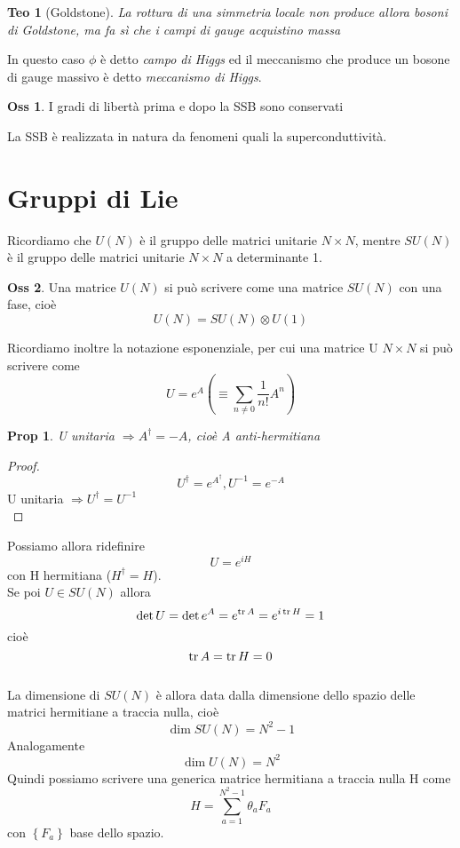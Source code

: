 \documentclass[10pt,a4paper]{article}
\newtheorem{thm}{Teo}[section]
\newtheorem{prop}{Prop}[section]
\theoremstyle{definition}
\newtheorem{observation}{Oss}[section]
\begin{document}
\begin{thm}[Goldstone]
    La rottura di una simmetria locale non produce allora bosoni di Goldstone, ma fa sì che i campi di gauge acquistino massa 
\end{thm}
In questo caso $\phi$ è detto \textit{campo di Higgs} ed il meccanismo che produce un bosone di gauge massivo è detto \textit{meccanismo di Higgs}.
\begin{observation}
    I gradi di libertà prima e dopo la SSB sono conservati
\end{observation}
La SSB è realizzata in natura da fenomeni quali la superconduttività.

\section{Gruppi di Lie}
Ricordiamo che $U(N)$ è il gruppo delle matrici unitarie $N\times N$, mentre $SU(N)$ è il gruppo delle matrici unitarie $N \times N$ a determinante 1.
\begin{observation}
    Una matrice $U(N)$ si può scrivere come una matrice $SU(N)$ con una fase, cioè
    \[
    U(N) = SU(N) \otimes U(1)    
    \]
\end{observation} 
Ricordiamo inoltre la notazione esponenziale, per cui una matrice U $N \times N$ si può scrivere come
\[
U = e^{A} \left( \equiv \sum_{n \neq 0} \frac{1}{n!} A^n \right)    
\]
\begin{prop}
    U unitaria $\Rightarrow A^\dagger = -A$, cioè A anti-hermitiana 
\end{prop}

\begin{proof}
    \[U^\dagger = e^{A^\dagger}, U^{-1} = e^{-A}\] U unitaria $\Rightarrow U^\dagger = U^{-1}$ \\
\end{proof}

Possiamo allora ridefinire 
\[U = e^{iH}\]
con H hermitiana ($H^\dagger = H$).
\\
Se poi $U \in SU(N)$ allora 
\[
\det U = \det e^A = e^{\tr A} = e^{i\tr H} = 1  
\]
cioè    
\[
    \tr A = \tr H = 0
\]
\\
La dimensione di $SU(N)$ è allora data dalla dimensione dello spazio delle matrici hermitiane a traccia nulla, cioè
\[
\dim SU(N) = N^2 - 1    
\]
Analogamente
\[
\dim U(N) = N^2    
\]
Quindi possiamo scrivere una generica matrice hermitiana a traccia nulla H come
\[
H = \sum_{a = 1}^{N^2 - 1} \theta_a F_a     
\]
con $\left\{ F_a  \right\}$ base dello spazio.
\end{document}
